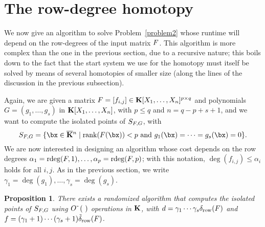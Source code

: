 \documentclass[12pt]{article}
\newtheorem{proposition}[definition]{Proposition}
\begin{document}
\section{The row-degree homotopy}\label{sec:rowdegree}

We now give an algorithm to solve Problem~\ref{problem2} whose runtime
will depend on the row-degrees of the input matrix ${F}$. This
algorithm is more complex than the one in the previous section, due to
a recursive nature; this boils down to the fact that the start system
we use for the homotopy must itself be solved by means of several
homotopies of smaller size (along the lines of the discussion in the 
previous subsection).

Again, we are given a matrix ${F} =[f_{i,j}]\in \mathbf{K}[X_1,\dots,X_n]^{p
  \times q}$ and polynomials $G=(g_1,\dots,g_s)$ in
$\mathbf{K}[X_1,\dots,X_n]$, with $p \leq q$ and $n = q-p+s+1$, and we want to
compute the isolated points of $S_{{F},G}$, with
$$S_{\mF,G} = \{\bx \in \KKbar{}^n \mid \mathrm{rank}(\mF({\bx})) < p
\text{~and~} g_1(\bx)=\cdots=g_s(\bx)=0\}.$$ We are now interested in
designing an algorithm whose cost depends on the row degrees
$\alpha_1=\mathrm{rdeg}({F},1),\dots,\alpha_p=\mathrm{rdeg}({F},p)$; with this
notation, $\deg(f_{i,j}) \leq \alpha_i$ holds for all $i,j$. As in the
previous section, we write
$\gamma_1=\deg(g_1),\dots,\gamma_s=\deg(g_s)$.

\begin{proposition}\label{prop:rowdegree}
  There exists a randomized algorithm that computes the isolated
  points of $S_{{F},G}$ using ${O}{\,\tilde{ }\,}\left (\ \right)$ operations in
  $\mathbf{K}$, with $d=\gamma_1\cdots\gamma_s \delta_{\rm row}({F})$ and
  $f=(\gamma_1+1)\cdots(\gamma_s+1) \tilde\delta_{\rm row}({F})$.
\end{proposition}


\end{document}
